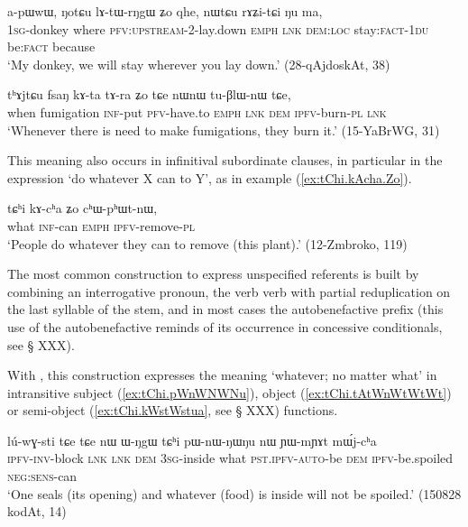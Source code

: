 \begin{exe}
\ex \label{ex:NotCu.lAtWrNgW}
\gll a-pɯwɯ, ŋotɕu lɤ-tɯ-rŋgɯ ʑo qhe, nɯtɕu rɤʑi-tɕi ŋu ma, \\
\textsc{1sg}-donkey where \textsc{pfv:upstream}-2-lay.down \textsc{emph} \textsc{lnk} \textsc{dem:loc} stay:\textsc{fact}-\textsc{1du} be:\textsc{fact} because \\
\glt `My donkey, we will stay wherever you lay down.' (28-qAjdoskAt, 38)
\end{exe}  
 
\begin{exe}
\ex \label{ex:thAjtCu.fsaN}
\gll tʰɤjtɕu fsaŋ kɤ-ta tɤ-ra ʑo tɕe nɯnɯ tu-βlɯ-nɯ tɕe, \\
when fumigation \textsc{inf}-put \textsc{pfv}-have.to \textsc{emph} \textsc{lnk} \textsc{dem} \textsc{ipfv}-burn-\textsc{pl} \textsc{lnk} \\
\glt `Whenever there is need to make fumigations, they burn it.' (15-YaBrWG, 31)
\end{exe}  

This meaning also occurs in infinitival subordinate clauses, in particular in the expression  `do whatever X can to Y', as in example (\ref{ex:tChi.kAcha.Zo}).

\begin{exe}
\ex \label{ex:tChi.kAcha.Zo}
\gll  tɕʰi kɤ-cʰa ʑo cʰɯ-pʰɯt-nɯ, \\
what \textsc{inf}-can \textsc{emph} \textsc{ipfv}-remove-\textsc{pl} \\
\glt `People do whatever they can to remove (this plant).' (12-Zmbroko, 119)
\end{exe}

The most common construction to express unspecified referents is built by combining an interrogative pronoun, the verb verb with partial reduplication on the last syllable of the stem, and in most cases the autobenefactive  prefix (this use of the autobenefactive reminds of its occurrence in concessive conditionals, see § XXX).  

With , this construction expresses the meaning `whatever; no matter what' in intransitive subject (\ref{ex:tChi.pWnWNWNu}), object (\ref{ex:tChi.tAtWnWtWtWt}) or semi-object (\ref{ex:tChi.kWstWstua}, see § XXX) functions.

\begin{exe}
\ex \label{ex:tChi.pWnWNWNu}
\gll lú-wɣ-sti tɕe tɕe nɯ ɯ-ŋgɯ tɕʰi pɯ-nɯ-ŋɯ\redp{}ŋu nɯ ɲɯ-mɲɤt mɯ́j-cʰa \\
\textsc{ipfv-inv}-block \textsc{lnk} \textsc{lnk} \textsc{dem} \textsc{3sg}-inside what \textsc{pst.ipfv}-\textsc{auto}-be \textsc{dem} \textsc{ipfv}-be.spoiled \textsc{neg:sens}-can \\
\glt `One seals (its opening) and whatever (food) is inside will not be spoiled.' (150828 kodAt, 14)
\end{exe}  

